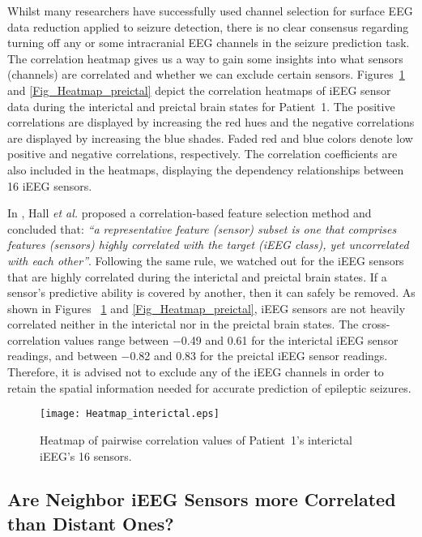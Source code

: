 \documentclass[journal]{IEEEtran}
\begin{document}
Whilst many researchers have successfully used channel selection for surface EEG data reduction applied to seizure detection, there is no clear consensus regarding turning off any or some intracranial EEG channels in the seizure prediction task. The correlation heatmap gives us a way to gain some insights into what sensors (channels) are correlated and whether we can exclude certain sensors. Figures~\ref{Fig_Heatmap_interictal} and \ref{Fig_Heatmap_preictal} depict the correlation heatmaps of iEEG sensor data during the interictal and preictal brain states for Patient~1. The positive correlations are displayed by increasing the red hues and the negative correlations are displayed by increasing the blue shades. Faded red and blue colors denote low positive and negative correlations, respectively. The correlation coefficients are also included in the heatmaps, displaying the dependency relationships between 16 iEEG sensors.



In \cite{hall1999correlation}, Hall \textit{et al.} proposed a correlation-based feature selection method and concluded that: \textit{``a representative feature (sensor) subset is one that comprises features (sensors) highly correlated with the target (iEEG class), yet uncorrelated with each other''}. Following the same rule, we watched out for the iEEG sensors that are highly correlated during the interictal and preictal brain states. If a sensor’s predictive ability is covered by another, then it can safely be removed. As shown in Figures ~\ref{Fig_Heatmap_interictal} and \ref{Fig_Heatmap_preictal}, iEEG sensors are not heavily correlated neither in the interictal nor in the preictal brain states. The cross-correlation values range between $-$0.49 and 0.61 for the interictal iEEG sensor readings, and between $-$0.82 and 0.83 for the preictal iEEG sensor readings. Therefore, it is advised not to exclude any of the iEEG channels in order to retain the spatial information needed for accurate prediction of epileptic seizures.



\begin{figure}[!t]\centering
	\texttt{[image: Heatmap\_interictal.eps]}
	\caption{Heatmap of pairwise correlation values of Patient~1’s interictal iEEG's 16 sensors.}
\label{Fig_Heatmap_interictal}
\end{figure}


\subsection{Are Neighbor iEEG Sensors more Correlated than Distant Ones?}
\end{document}
